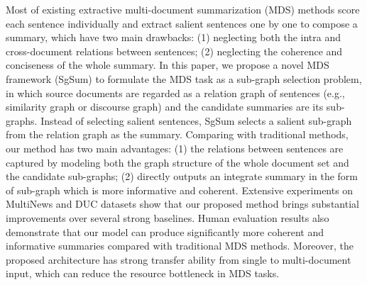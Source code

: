 Most of existing extractive multi-document summarization (MDS) methods score each sentence individually and extract salient sentences one by one to compose a summary, which have two main drawbacks: (1) neglecting both the intra and cross-document relations between sentences; (2) neglecting the coherence and conciseness of the whole summary. In this paper, we propose a novel MDS framework (SgSum) to formulate the MDS task as a sub-graph selection problem, in which source documents are regarded as a relation graph of sentences (e.g., similarity graph or discourse graph) and the candidate summaries are its sub-graphs. Instead of selecting salient sentences, SgSum selects a salient sub-graph from the relation graph as the summary. Comparing with traditional methods, our method has two main advantages: (1) the relations between sentences are captured by modeling both the graph structure of the whole document set and the candidate sub-graphs; (2) directly outputs an integrate summary in the form of sub-graph which is more informative and coherent. Extensive experiments on MultiNews and DUC datasets show that our proposed method brings substantial improvements over several strong baselines. Human evaluation results also demonstrate that our model can produce significantly more coherent and informative summaries compared with traditional MDS methods. Moreover, the proposed architecture has strong transfer ability from single to multi-document input, which can reduce the resource bottleneck in MDS tasks.
